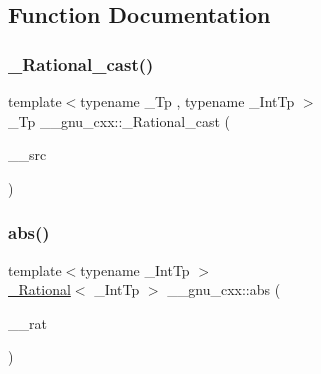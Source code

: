 \subsection{Function Documentation}
\mbox{\label{namespace____gnu__cxx_a6750f8db7f8f741652ad075b941b16ff}} 
\subsubsection{\texorpdfstring{\+\_\+\+Rational\+\_\+cast()}{\_Rational\_cast()}}
{\footnotesize\ttfamily template$<$typename \+\_\+\+Tp , typename \+\_\+\+Int\+Tp $>$ \\
\+\_\+\+Tp \+\_\+\+\_\+gnu\+\_\+cxx\+::\+\_\+\+Rational\+\_\+cast (\begin{DoxyParamCaption}\item[{const \hyperlink{class____gnu__cxx_1_1__Rational}{\+\_\+\+Rational}$<$ \+\_\+\+Int\+Tp $>$ \&}]{\+\_\+\+\_\+src }\end{DoxyParamCaption})\hspace{0.3cm}{\ttfamily [inline]}}

\mbox{\label{namespace____gnu__cxx_ab4e548de60455eb94b74c126f008263b}} 
\subsubsection{\texorpdfstring{abs()}{abs()}}
{\footnotesize\ttfamily template$<$typename \+\_\+\+Int\+Tp $>$ \\
\hyperlink{class____gnu__cxx_1_1__Rational}{\+\_\+\+Rational}$<$ \+\_\+\+Int\+Tp $>$ \+\_\+\+\_\+gnu\+\_\+cxx\+::abs (\begin{DoxyParamCaption}\item[{const \hyperlink{class____gnu__cxx_1_1__Rational}{\+\_\+\+Rational}$<$ \+\_\+\+Int\+Tp $>$ \&}]{\+\_\+\+\_\+rat }\end{DoxyParamCaption})\hspace{0.3cm}{\ttfamily [inline]}}

\mbox{\label{namespace____gnu__cxx_ab5a882f1c1b6e31c999e472832a9cdb2}} 
